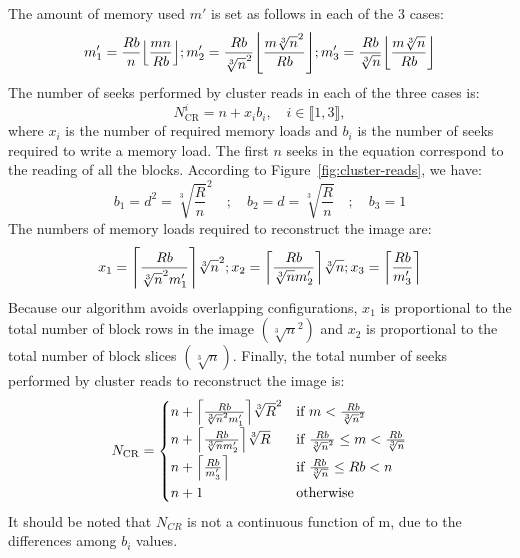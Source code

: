 \documentclass[10pt, conference, compsocconf]{IEEEtran}
\DeclarePairedDelimiter{\ceil}{\lceil}{\rceil}
\DeclarePairedDelimiter{\floor}{\lfloor}{\rfloor}
\begin{document}
The amount of memory used $m'$ is set as follows in each of the 3 cases:
\begin{equation*}
  m_1' = \frac{Rb}{n}\floor*{\frac{mn}{Rb}};
  m_2' = \frac{Rb}{\sqrt[3]{n}^2}\floor*{\frac{m\sqrt[3]{n}^2}{Rb}};
  m_3' = \frac{Rb}{\sqrt[3]{n}}\floor*{\frac{m\sqrt[3]{n}}{Rb}}
\end{equation*}
The number of seeks performed by cluster reads in each of the three cases is:
\begin{equation*}
  N^i_{\mathrm{CR}} = n + x_ib_i, \quad i \in \llbracket 1, 3\rrbracket,
\end{equation*}
where $x_i$ is the number of required memory loads and $b_i$ is the
number of seeks required to write a memory load. The first $n$ seeks
in the equation correspond to the reading of all the blocks. According
to Figure~\ref{fig:cluster-reads}, we have:
\begin{equation*}
  b_1=d^2=\sqrt[3]{\frac{R}{n}}^2 \quad ; \quad b_2=d=\sqrt[3]{\frac{R}{n}} \quad ; \quad b_3=1
\end{equation*}
The
numbers of memory loads required to reconstruct the image are:
\begin{equation*}
  x_1 = \ceil*{\frac{Rb}{\sqrt[3]{n}^2m_1'}}\sqrt[3]{n}^2;
  x_2 = \ceil*{\frac{Rb}{\sqrt[3]{n}m_2'}}\sqrt[3]{n};
  x_3 = \ceil*{\frac{Rb}{m_3'}}
\end{equation*}
Because our algorithm avoids overlapping configurations, $x_1$ is
proportional to the total number of block rows in the image
$\left( \sqrt[3]{n}^2 \right)$ and $x_2$ is proportional to the total number of
block slices $\left( \sqrt[3]{n} \right)$.
Finally, the total number of seeks
performed by cluster reads to reconstruct the image is:
\begin{equation}
N_\mathrm{CR} =
\begin{cases}
  n + \ceil*{\frac{Rb}{\sqrt[3]{n}^2m_1'}}\sqrt[3]{R}^2     & \text{if } m < \frac{Rb}{\sqrt[3]{n}^2}\\[0.4em]
  n + \ceil*{\frac{Rb}{\sqrt[3]{n}m_2'}}\sqrt[3]{R}        & \text{if } \frac{Rb}{\sqrt[3]{n}^2} \leq m < \frac{Rb}{\sqrt[3]{n}}\\[0.4em]
  n + \ceil*{\frac{Rb}{m_3'}}                              & \text{if } \frac{Rb}{\sqrt[3]{n}} \leq Rb < n\\[0.4em]
  n + 1                                                          & \text{otherwise}
\end{cases} \label{eq:seeks-cluster-reads-1}
\end{equation}
It should be noted that $N_{CR}$ is not a continuous function of m,
due to the differences among $b_i$ values.
\end{document}
